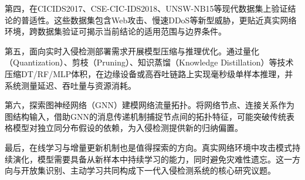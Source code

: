 第四，在CICIDS2017、CSE-CIC-IDS2018、UNSW-NB15等现代数据集上验证结论的普适性。这些数据集包含Web攻击、慢速DDoS等新型威胁，更贴近真实网络环境，跨数据集验证可揭示当前结论的适用范围与边界条件。

第五，面向实时入侵检测部署需求开展模型压缩与推理优化。通过量化（Quantization）、剪枝（Pruning）、知识蒸馏（Knowledge Distillation）等技术压缩DT/RF/MLP体积，在边缘设备或高吞吐链路上实现毫秒级单样本推理，并系统测量延迟、吞吐量与资源消耗。

第六，探索图神经网络（GNN）建模网络流量拓扑。将网络节点、连接关系作为图结构输入，借助GNN的消息传递机制捕捉节点间的拓扑特征，可能突破传统表格模型对独立同分布假设的依赖，为入侵检测提供新的归纳偏置。

最后，在线学习与增量更新机制也是值得探索的方向。真实网络环境中攻击模式持续演化，模型需要具备从新样本中持续学习的能力，同时避免灾难性遗忘。这一方向与开放集识别、主动学习共同构成下一代入侵检测系统的核心研究议题。
